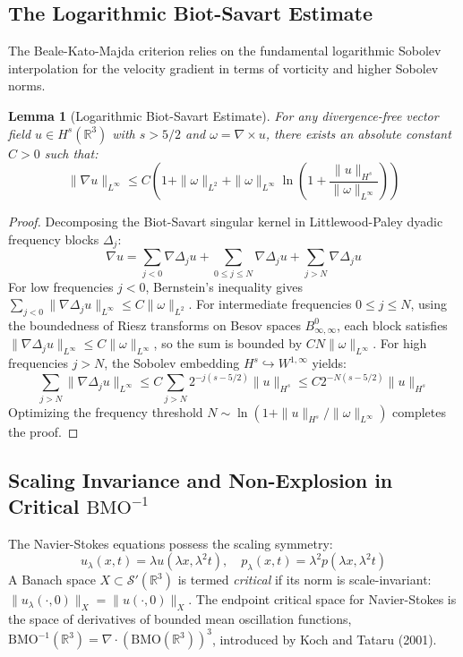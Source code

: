 \documentclass[11pt,a4paper]{article}
\newtheorem{lemma}[theorem]{Lemma}
\theoremstyle{definition}
\begin{document}
\subsection{The Logarithmic Biot-Savart Estimate}
The Beale-Kato-Majda criterion relies on the fundamental logarithmic Sobolev interpolation for the velocity gradient in terms of vorticity and higher Sobolev norms.
\begin{lemma}[Logarithmic Biot-Savart Estimate]
For any divergence-free vector field $u \in H^s(\mathbb{R}^3)$ with $s > 5/2$ and $\omega = \nabla \times u$, there exists an absolute constant $C > 0$ such that:
\begin{equation}
\|\nabla u\|_{L^\infty} \le C \left( 1 + \|\omega\|_{L^2} + \|\omega\|_{L^\infty} \ln \left( 1 + \frac{\|u\|_{H^s}}{\|\omega\|_{L^\infty}} \right) \right)
\end{equation}
\end{lemma}
\begin{proof}
Decomposing the Biot-Savart singular kernel in Littlewood-Paley dyadic frequency blocks $\Delta_j$:
\begin{equation}
\nabla u = \sum_{j < 0} \nabla \Delta_j u + \sum_{0 \le j \le N} \nabla \Delta_j u + \sum_{j > N} \nabla \Delta_j u
\end{equation}
For low frequencies $j < 0$, Bernstein's inequality gives $\sum_{j<0} \|\nabla \Delta_j u\|_{L^\infty} \le C \|\omega\|_{L^2}$.
For intermediate frequencies $0 \le j \le N$, using the boundedness of Riesz transforms on Besov spaces $B_{\infty, \infty}^0$, each block satisfies $\|\nabla \Delta_j u\|_{L^\infty} \le C \|\omega\|_{L^\infty}$, so the sum is bounded by $C N \|\omega\|_{L^\infty}$.
For high frequencies $j > N$, the Sobolev embedding $H^s \hookrightarrow W^{1, \infty}$ yields:
\begin{equation}
\sum_{j > N} \|\nabla \Delta_j u\|_{L^\infty} \le C \sum_{j > N} 2^{-j(s - 5/2)} \|u\|_{H^s} \le C 2^{-N(s - 5/2)} \|u\|_{H^s}
\end{equation}
Optimizing the frequency threshold $N \sim \ln(1 + \|u\|_{H^s} / \|\omega\|_{L^\infty})$ completes the proof.
\end{proof}

\subsection{Scaling Invariance and Non-Explosion in Critical \texorpdfstring{$\mathrm{BMO}^{-1}$}{BMO-1}}
The Navier-Stokes equations possess the scaling symmetry:
\begin{equation}
u_\lambda(x, t) = \lambda u(\lambda x, \lambda^2 t), \quad p_\lambda(x, t) = \lambda^2 p(\lambda x, \lambda^2 t)
\end{equation}
A Banach space $X \subset \mathcal{S}'(\mathbb{R}^3)$ is termed \textit{critical} if its norm is scale-invariant: $\|u_\lambda(\cdot, 0)\|_X = \|u(\cdot, 0)\|_X$.
The endpoint critical space for Navier-Stokes is the space of derivatives of bounded mean oscillation functions, $\mathrm{BMO}^{-1}(\mathbb{R}^3) = \nabla \cdot (\mathrm{BMO}(\mathbb{R}^3))^3$, introduced by Koch and Tataru (2001).
\end{document}
